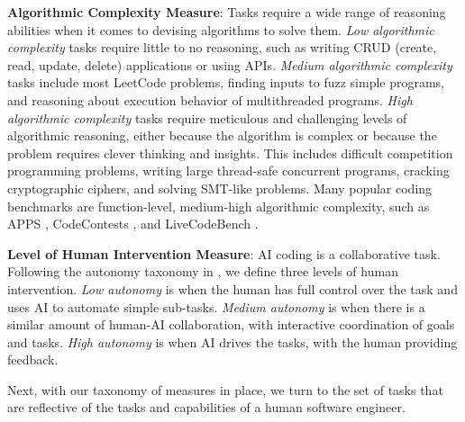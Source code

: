 \textbf{Algorithmic Complexity Measure}: Tasks require a wide range of reasoning abilities when it comes to devising algorithms to solve them. \textit{Low algorithmic complexity} tasks require little to no reasoning, such as writing CRUD (create, read, update, delete) applications or using APIs. \textit{Medium algorithmic complexity} tasks include most LeetCode problems, finding inputs to fuzz simple programs, and reasoning about execution behavior of multithreaded programs. \textit{High algorithmic complexity} tasks require meticulous and challenging levels of algorithmic reasoning, either because the algorithm is complex or because the problem requires clever thinking and insights. This includes difficult competition programming problems, writing large thread-safe concurrent programs, cracking cryptographic ciphers, and solving SMT-like problems. Many popular coding benchmarks are function-level, medium-high algorithmic complexity, such as APPS \citep{hendrycksapps2021}, CodeContests \citep{li2022competition}, and LiveCodeBench \citep{jain2024livecodebenchholisticcontaminationfree}. 

\textbf{Level of Human Intervention Measure}: AI coding is a collaborative task. Following the autonomy taxonomy in \citet{morris2023levels}, we define three levels of human intervention. \textit{Low autonomy} is when the human has full control over the task and uses AI to automate simple sub-tasks. \textit{Medium autonomy} is when there is a similar amount of human-AI collaboration, with interactive coordination of goals and tasks. \textit{High autonomy} is when AI drives the tasks, with the human providing feedback. 

Next, with our taxonomy of measures in place, we turn to the set of tasks that are reflective of the tasks and capabilities of a human software engineer. 









